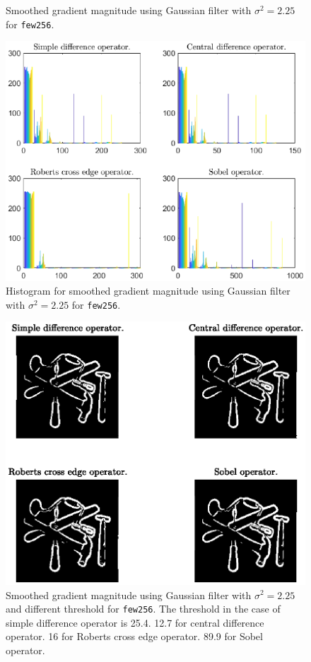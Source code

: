 \documentclass[11pt,a4paper]{article}
\begin{document}
\begin{itemize}
\begin{figure}[!ht]
			\caption{Smoothed gradient magnitude using Gaussian filter with $\sigma^{2}=2.25$ for \texttt{few256}.}
			\label{fig:Question_2_Tools_Gaussian_2-25}
		\end{figure}
		\begin{figure}[!ht]
			\centering
			\includegraphics[width=0.9\columnwidth]{Question_2_Tools_Gaussian_2-25_Hist.eps}
			\caption{Histogram for smoothed gradient magnitude using Gaussian filter with $\sigma^{2}=2.25$ for \texttt{few256}.}
			\label{fig:Question_2_Tools_Gaussian_2-25_Hist}
		\end{figure}
		\begin{figure}[!ht]
			\centering
			\includegraphics[width=0.85\columnwidth]{Question_2_Tools_Gaussian_2-25_Threshold.eps}
			\caption{Smoothed gradient magnitude using Gaussian filter with $\sigma^{2}=2.25$ and different threshold for \texttt{few256}. The threshold in the case of simple difference operator is 25.4. 12.7 for central difference operator. 16 for Roberts cross edge operator. 89.9 for Sobel operator.}

\end{figure}
\end{itemize}
\end{document}
